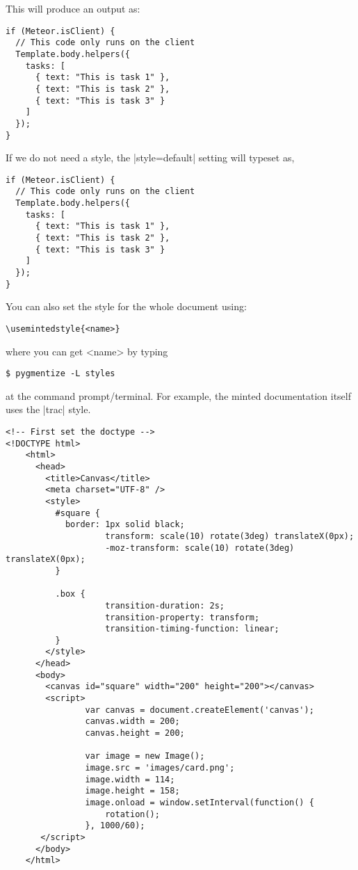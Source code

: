 This will produce an output as:
\medskip

\begin{verbatim}
if (Meteor.isClient) {
  // This code only runs on the client
  Template.body.helpers({
    tasks: [
      { text: "This is task 1" },
      { text: "This is task 2" },
      { text: "This is task 3" }
    ]
  });
}
\end{verbatim}

If we do not need a style, the |style=default| setting will typeset as,

\begin{verbatim}
if (Meteor.isClient) {
  // This code only runs on the client
  Template.body.helpers({
    tasks: [
      { text: "This is task 1" },
      { text: "This is task 2" },
      { text: "This is task 3" }
    ]
  });
}
\end{verbatim}

You can also set the style for the whole document using:

\begin{verbatim}
\usemintedstyle{<name>}
\end{verbatim}
where you can get <name> by typing

\begin{verbatim}
$ pygmentize -L styles
\end{verbatim}
at the command prompt/terminal. For example, the minted documentation itself uses the |trac| style.

\begin{verbatim}
<!-- First set the doctype -->
<!DOCTYPE html>
    <html>
      <head>
        <title>Canvas</title>
        <meta charset="UTF-8" />
        <style>
          #square {
            border: 1px solid black;
                    transform: scale(10) rotate(3deg) translateX(0px);
                    -moz-transform: scale(10) rotate(3deg) translateX(0px);
          }

          .box {              
                    transition-duration: 2s;
                    transition-property: transform;
                    transition-timing-function: linear;
          }
        </style>
      </head>
      <body>
        <canvas id="square" width="200" height="200"></canvas>
        <script>
                var canvas = document.createElement('canvas');
                canvas.width = 200;
                canvas.height = 200;

                var image = new Image();
                image.src = 'images/card.png';
                image.width = 114;
                image.height = 158;
                image.onload = window.setInterval(function() {
                    rotation();
                }, 1000/60);
       </script>
      </body>
    </html>
\end{verbatim} 
   




